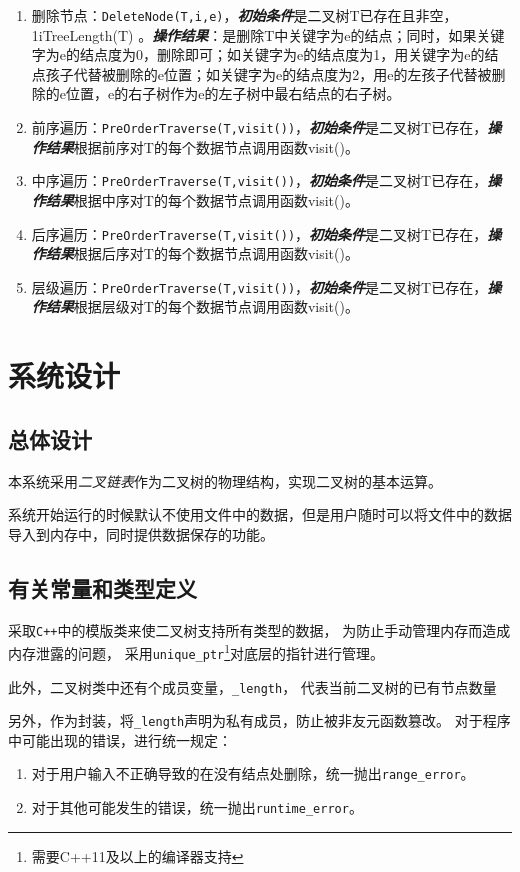 \begin{enumerate}
\item 删除节点：\texttt{DeleteNode(T,i,e)}，\newline \textbf{\emph{初始条件}}是二叉树T已存在且非空，1\le i\le TreeLength(T) 。\newline \textbf{\emph{操作结果}}：是删除T中关键字为e的结点；同时，如果关键字为e的结点度为0，删除即可；如关键字为e的结点度为1，用关键字为e的结点孩子代替被删除的e位置；如关键字为e的结点度为2，用e的左孩子代替被删除的e位置，e的右子树作为e的左子树中最右结点的右子树。
\item 前序遍历：\texttt{PreOrderTraverse(T,visit())}，\newline \textbf{\emph{初始条件}}是二叉树T已存在，\newline \textbf{\emph{操作结果}}根据前序对T的每个数据节点调用函数visit()。
\item 中序遍历：\texttt{PreOrderTraverse(T,visit())}，\newline \textbf{\emph{初始条件}}是二叉树T已存在，\newline \textbf{\emph{操作结果}}根据中序对T的每个数据节点调用函数visit()。
\item 后序遍历：\texttt{PreOrderTraverse(T,visit())}，\newline \textbf{\emph{初始条件}}是二叉树T已存在，\newline \textbf{\emph{操作结果}}根据后序对T的每个数据节点调用函数visit()。
\item 层级遍历：\texttt{PreOrderTraverse(T,visit())}，\newline \textbf{\emph{初始条件}}是二叉树T已存在，\newline \textbf{\emph{操作结果}}根据层级对T的每个数据节点调用函数visit()。
\end{enumerate}
\section{系统设计}
\subsection{总体设计}
本系统采用\emph{二叉链表}作为二叉树的物理结构，实现二叉树的基本运算。
\par
系统开始运行的时候默认不使用文件中的数据，但是用户随时可以将文件中的数据导入到内存中，同时提供数据保存的功能。
\subsection{有关常量和类型定义}
采取\texttt{C++}中的模版类来使二叉树支持所有类型的数据，
为防止手动管理内存而造成内存泄露的问题，
采用\texttt{unique\_ptr}\footnote{需要C++11及以上的编译器支持}对底层的指针进行管理。
\par
此外，二叉树类中还有个成员变量，\texttt{\_length}，
代表当前二叉树的已有节点数量
\par
另外，作为封装，将\texttt{\_length}声明为私有成员，防止被非友元函数篡改。
对于程序中可能出现的错误，进行统一规定：
\begin{enumerate}
    \item 对于用户输入不正确导致的在没有结点处删除，统一抛出\texttt{range\_error}。
    \item 对于其他可能发生的错误，统一抛出\texttt{runtime\_error}。
\end{enumerate}
